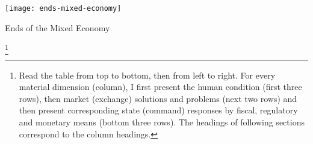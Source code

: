 
\begin{landscape}
 \begin{table}[htbp]
	\begin{center}
	\texttt{[image: ends-mixed-economy]}  
	\caption{Ends of the Mixed Economy \label{tab:ends-mixed-economy}}
\end{center}
\newpage
\end{table}
\end{landscape}\footnote{
Read the table from top to bottom, then from left to right. For every material dimension (column), I first present the human condition (first three rows), then market (exchange) solutions and problems (next two rows) and then present corresponding state (command) responses by fiscal, regulatory and monetary means (bottom three rows). The headings of following sections correspond to the column headings.

}
